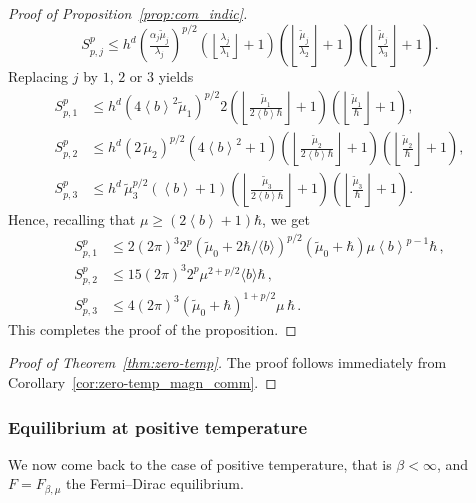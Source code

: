 \documentclass[11pt]{amsart}
\theoremstyle{plain}
\theoremstyle{definition}
\newcommand		{\lt}			{\left}				%
\newcommand		{\rt}			{\right}			%
\renewcommand	{\(}			{\lt(}
\renewcommand	{\)}			{\rt)}
\newcommand		{\floor}[1]		{\lt\lfloor{#1}\rt\rfloor}
\newcommand		{\bangle}[1]	{\lt\langle #1\rt\rangle}
\newcommand		{\weight}[1]	{\bangle{#1}}	%
\newcommand		{\hd}		{h^d}
\begin{document}
\begin{proof}[Proof of Proposition~\ref{prop:com_indic}]
        \begin{equation*}
            S_{p, j}^p \leq \hd\lt(\tfrac{\alpha_j\tilde{\mu}_j}{\lambda_j}\rt)^{p/2} \lt(\floor{\tfrac{\lambda_j}{\lambda_1}} + 1\rt) \lt(\floor{\tfrac{\tilde{\mu}_j}{\lambda_2}} + 1\rt) \lt(\floor{\tfrac{\tilde{\mu}_j}{\lambda_3}} + 1\rt).
        \end{equation*}
        Replacing $j$ by $1$, $2$ or $3$ yields
        \begin{align*}
            S_{p, 1}^p &\leq \hd\lt(4\weight{b}^2\tilde{\mu}_1\rt)^{p/2} 2 \lt(\floor{\tfrac{\tilde{\mu}_1}{2\weight{b}\hbar}} + 1\rt) \lt(\floor{\tfrac{\tilde{\mu}_1}{\hbar}} + 1\rt),
            \\
            S_{p, 2}^p &\leq \hd\lt(2\,\tilde{\mu}_2\rt)^{p/2} \lt(4\weight{b}^2 + 1\rt) \lt(\floor{\tfrac{\tilde{\mu}_2}{2\weight{b}\hbar}} + 1\rt) \lt(\floor{\tfrac{\tilde{\mu}_2}{\hbar}} + 1\rt),
            \\
            S_{p, 3}^p &\leq \hd\,\tilde{\mu}_3^{p/2} \lt(\weight{b} + 1\rt) \lt(\floor{\tfrac{\tilde{\mu}_3}{2\weight{b}\hbar}} + 1\rt) \lt(\floor{\tfrac{\tilde{\mu}_3}{\hbar}} + 1\rt).
        \end{align*}
        Hence, recalling that $\mu \geq \lt(2\weight{b}+1\rt)\hbar$, we get
        \begin{align*}
            S_{p, 1}^p &\leq 2 \lt(2\pi\rt)^3 2^p \lt(\tilde{\mu}_0 + 2\hbar/\langle b\rangle\rt)^{p/2} \lt(\tilde{\mu}_0 + \hbar\rt) \mu \weight{b}^{p-1}\hbar \, ,
            \\
            S_{p, 2}^p &\leq 15 \lt(2\pi\rt)^3 2^p \mu^{2+p/2} \langle b\rangle \hbar \, ,
            \\
            S_{p, 3}^p &\leq 4 \lt(2\pi\rt)^3 (\tilde{\mu}_0 + \hbar)^{1+p/2} \mu\, \hbar \,.
        \end{align*}
        This completes the proof of the proposition.
    \end{proof}

    \begin{proof}[Proof of Theorem~\ref{thm:zero-temp}]
        The proof follows immediately from Corollary~\ref{cor:zero-temp_magn_comm}.
    \end{proof}

\subsubsection{Equilibrium at positive temperature}

    We now come back to the case of positive temperature, that is $\beta < \infty$, and $F = F_{\beta,\mu}$ the Fermi--Dirac equilibrium.
\end{document}
